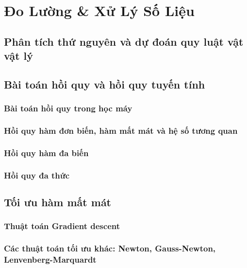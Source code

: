   
\chapter{Đo Lường \& Xử Lý Số Liệu}

\section{Phân tích thứ nguyên và dự đoán quy luật vật vật lý}


\section{Bài toán hồi quy và hồi quy tuyến tính}

\subsection{Bài toán hồi quy trong học máy}

\subsection{Hồi quy hàm đơn biến, hàm mất mát và hệ số tương quan}

\subsection{Hồi quy hàm đa biến}

\subsection{Hồi quy đa thức}

\section{Tối ưu hàm mất mát}

\subsection{Thuật toán Gradient descent}

\subsection{Các thuật toán tối ưu khác: Newton, Gauss-Newton, Lenvenberg-Marquardt}

